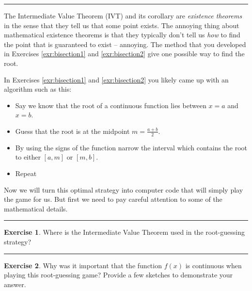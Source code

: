 \documentclass[
]{book}
\providecommand{\tightlist}{%
  \setlength{\itemsep}{0pt}\setlength{\parskip}{0pt}}
\theoremstyle{definition}
\theoremstyle{definition}
\theoremstyle{definition}
\newtheorem{exercise}{Exercise}[chapter]
\theoremstyle{remark}
\begin{document}
\begin{center}\rule{0.5\linewidth}{0.5pt}\end{center}

The Intermediate Value Theorem (IVT) and its corollary are \emph{existence theorems} in the
sense that they tell us that some point exists. The annoying thing about
mathematical existence theorems is that they typically don't tell us
\emph{how} to find the point that is guaranteed to exist -- annoying. The method that you developed in Exercises \ref{exr:bisection1} and \ref{exr:bisection2} give one possible way to find the root.

In Exercises \ref{exr:bisection1} and \ref{exr:bisection2} you likely came up with an algorithm such as this:

\begin{itemize}
\tightlist
\item
  Say we know that the root of a continuous function lies between \(x=a\) and \(x=b\).
\item
  Guess that the root is at the midpoint \(m = \frac{a+b}{2}\).
\item
  By using the signs of the function narrow the interval which contains the root to either \([a,m]\) or \([m,b]\).
\item
  Repeat
\end{itemize}

Now we will turn this optimal strategy into computer code that will simply play the game for us. But first we need to pay careful attention to some of the mathematical details.

\begin{center}\rule{0.5\linewidth}{0.5pt}\end{center}

\begin{exercise}
\protect\hypertarget{exr:unnamed-chunk-76}{}{\label{exr:unnamed-chunk-76} }Where is the Intermediate Value Theorem used in the root-guessing strategy?
\end{exercise}

\begin{center}\rule{0.5\linewidth}{0.5pt}\end{center}

\begin{exercise}
\protect\hypertarget{exr:unnamed-chunk-77}{}{\label{exr:unnamed-chunk-77} }Why was it important that the function \(f(x)\) is continuous when playing this root-guessing game? Provide a few sketches to demonstrate your answer.
\end{exercise}
\end{document}
